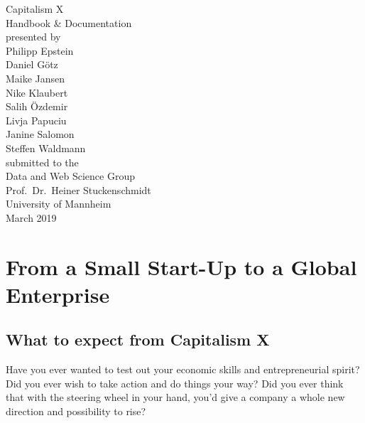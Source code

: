 \documentclass[11pt,titlepage,oneside,openany]{book}
\begin{document}
\begin{titlepage}
	\vspace*{2cm}
  \begin{center}
   {\Large Capitalism X\\}
   \vspace{2cm} 
   {Handbook \& Documentation\\}
   \vspace{2cm}
   {presented by\\
   Philipp Epstein \\
    Daniel G\"otz \\
Maike Jansen \\
Nike Klaubert \\
Salih \"Ozdemir \\
Livja Papuciu \\
Janine Salomon \\
Steffen Waldmann \\
   }
   \vspace{1cm} 
   {submitted to the\\
    Data and Web Science Group\\
    Prof.\ Dr.\ Heiner Stuckenschmidt\\
    University of Mannheim\\} \vspace{2cm}
   {March 2019}
  \end{center}
\end{titlepage} 

\tableofcontents
\newpage
\printglossary[style=long]
\listoffigures

\listoftables


\newpage

\chapter{From a Small Start-Up to a Global Enterprise}
\label{cha:intro}
\section{What to expect from Capitalism X}
\label{expectation}
Have you ever wanted to test out your economic skills and entrepreneurial spirit? Did you ever wish to take action and do things your way? Did you ever think that with the steering wheel in your hand, you'd give a company a whole new direction and possibility to rise? 
\end{document}
